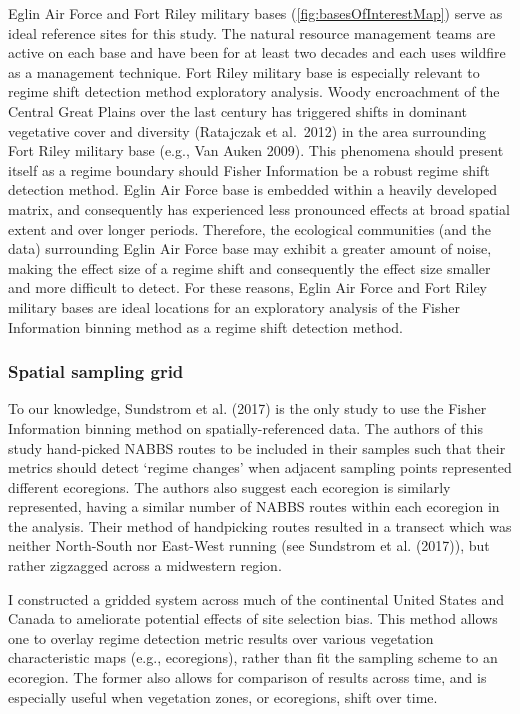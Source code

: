\documentclass[12pt,twoside]{reedthesis}
\begin{document}
Eglin Air Force and Fort Riley military bases (\ref{fig:basesOfInterestMap}) serve as ideal reference sites for this study. The natural resource management teams are active on each base and have been for at least two decades and each uses wildfire as a management technique. Fort Riley military base is especially relevant to regime shift detection method exploratory analysis. Woody encroachment of the Central Great Plains over the last century has triggered shifts in dominant vegetative cover and diversity (Ratajczak et al.~2012) in the area surrounding Fort Riley military base (e.g., Van Auken 2009). This phenomena should present itself as a regime boundary should Fisher Information be a robust regime shift detection method. Eglin Air Force base is embedded within a heavily developed matrix, and consequently has experienced less pronounced effects at broad spatial extent and over longer periods. Therefore, the ecological communities (and the data) surrounding Eglin Air Force base may exhibit a greater amount of noise, making the effect size of a regime shift and consequently the effect size smaller and more difficult to detect. For these reasons, Eglin Air Force and Fort Riley military bases are ideal locations for an exploratory analysis of the Fisher Information binning method as a regime shift detection method.

\hypertarget{spatial-sampling-grid}{%
\subsubsection{Spatial sampling grid}\label{spatial-sampling-grid}}

To our knowledge, Sundstrom et al. (2017) is the only study to use the Fisher Information binning method on spatially-referenced data. The authors of this study hand-picked NABBS routes to be included in their samples such that their metrics should detect `regime changes' when adjacent sampling points represented different ecoregions. The authors also suggest each ecoregion is similarly represented, having a similar number of NABBS routes within each ecoregion in the analysis. Their method of handpicking routes resulted in a transect which was neither North-South nor East-West running (see Sundstrom et al. (2017)), but rather zigzagged across a midwestern region.

I constructed a gridded system across much of the continental United States and Canada to ameliorate potential effects of site selection bias. This method allows one to overlay regime detection metric results over various vegetation characteristic maps (e.g., ecoregions), rather than fit the sampling scheme to an ecoregion. The former also allows for comparison of results across time, and is especially useful when vegetation zones, or ecoregions, shift over time.
\end{document}
